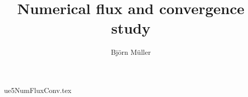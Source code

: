 \documentclass[10pt,a4paper]{article}
\title{Numerical flux and convergence study}
\author{Björn Müller}
\begin{document}
\maketitle

{ue5NumFluxConv.tex}
\end{document}
